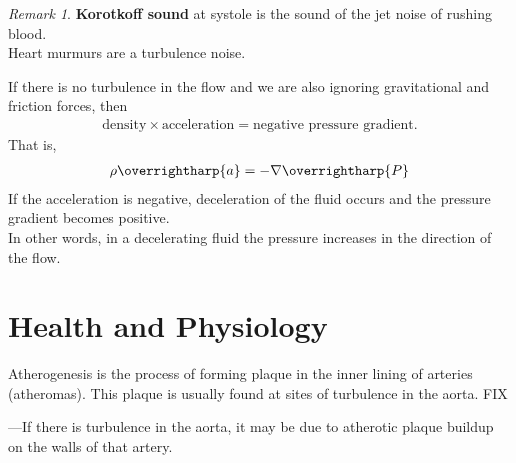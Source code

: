 \documentclass[12pt, a4paper]{article}
\theoremstyle{definition}
\theoremstyle{remark}
\newtheorem*{remark}{Remark}
\theoremstyle{definition}
\newcommand*{\vtr}[1]{\text{\overrightharp{\ensuremath{#1}}}}
\newcommand{\?}{\stackrel{?}{=}}
\renewcommand{\bf}[1]{\textbf{#1}}
\begin{document}
\begin{remark}
\bf{Korotkoff sound} at systole is the sound of the jet noise of rushing blood.\\
\indent Heart murmurs are a turbulence noise.
\end{remark}
\noindent If there is no turbulence in the flow and we are also ignoring gravitational and friction forces, then
\begin{align*}
\text{density} \times \text{acceleration} = \text{negative pressure gradient}.
\end{align*}
That is,
\begin{align}
\rho\vtr{a} = -\nabla\vtr{P}
\end{align}
If the acceleration is negative, deceleration of the fluid occurs and the pressure gradient becomes positive.\\
In other words, in a decelerating fluid the pressure increases in the direction of the flow. 

\newpage
\section{Health and Physiology}
Atherogenesis is the process of forming plaque in the inner lining of arteries (atheromas).  This plaque is usually found at sites of turbulence in the aorta.
FIX

—If there is turbulence in the aorta, it may be due to atherotic plaque buildup on the walls of that artery.
\end{document}
